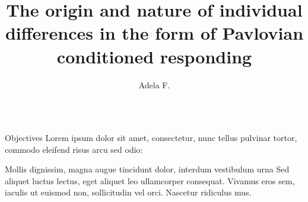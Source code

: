 \documentclass[final]{beamer}
\title{The origin and nature of individual differences in the form of Pavlovian conditioned responding} %
\author{Adela F.} %
\institute{X University} %
\newlength{\sepwid}
\newlength{\fourcolwid}
\begin{document}

\setlength{\belowcaptionskip}{2ex} %
\setlength\belowdisplayshortskip{2ex} %

\begin{frame}[t] %

\begin{columns}[t] %


\begin{column}{\fourcolwid} %

\begin{alertblock}{Objectives}
Lorem ipsum dolor sit amet, consectetur, nunc tellus pulvinar tortor, commodo eleifend risus arcu sed odio:

Mollis dignissim, magna augue tincidunt dolor, interdum vestibulum urna
Sed aliquet luctus lectus, eget aliquet leo ullamcorper consequat. Vivamus eros sem, iaculis ut euismod non, sollicitudin vel orci.
Nascetur ridiculus mus.  


\end{alertblock}


\end{column}

\end{columns} %

\end{frame} %
\end{document}
